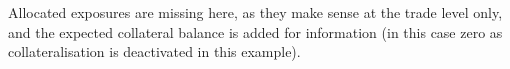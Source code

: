 \begin{center}
{\begin{tabular}{|l|l|r|r|r|r|r|r|r|}
\hline
\end{tabular}
}
\end{center}

Allocated exposures are missing here, as they make sense at the trade level only, and the expected collateral balance is
added for information (in this case zero as collateralisation is deactivated in this example).

